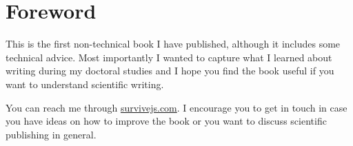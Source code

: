 

\chapter{Foreword}\label{foreword:cha}


This is the first non-technical book I have published, although it includes some technical advice. Most importantly I wanted to capture what I learned about writing during my doctoral studies and I hope you find the book useful if you want to understand scientific writing.

You can reach me through \url{survivejs.com}. I encourage you to get in touch in case you have ideas on how to improve the book or you want to discuss scientific publishing in general.

\hfil{}\hfil
